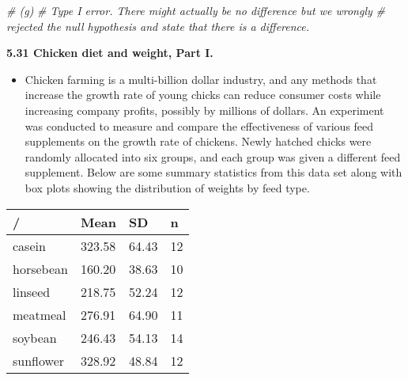 \documentclass[]{book}
\newenvironment{Shaded}{\begin{snugshade}}{\end{snugshade}}
\newcommand{\CommentTok}[1]{\textcolor[rgb]{0.56,0.35,0.01}{\textit{#1}}}
\providecommand{\tightlist}{%
  \setlength{\itemsep}{0pt}\setlength{\parskip}{0pt}}
\begin{document}
\begin{Shaded}
\begin{Highlighting}[]
\CommentTok{# (g)}
\CommentTok{# Type I error. There might actually be no difference but we wrongly }
\CommentTok{# rejected the null hypothesis and state that there is a difference.}
\end{Highlighting}
\end{Shaded}

\textbf{5.31 Chicken diet and weight, Part I.}

\begin{itemize}
\tightlist
\item
  Chicken farming is a multi-billion dollar industry, and any methods that increase the growth rate of young chicks can reduce consumer costs while increasing company profits, possibly by millions of dollars. An experiment was conducted to measure and compare the effectiveness of various feed supplements on the growth rate of chickens. Newly hatched chicks were randomly allocated into six groups, and each group was given a different feed supplement. Below are some summary statistics from this data set along with box plots showing the distribution of weights by feed type.
\end{itemize}

\begin{longtable}[]{@{}llll@{}}
\toprule
/ & Mean & SD & n\tabularnewline
\midrule
\endhead
casein & 323.58 & 64.43 & 12\tabularnewline
horsebean & 160.20 & 38.63 & 10\tabularnewline
linseed & 218.75 & 52.24 & 12\tabularnewline
meatmeal & 276.91 & 64.90 & 11\tabularnewline
soybean & 246.43 & 54.13 & 14\tabularnewline
sunflower & 328.92 & 48.84 & 12\tabularnewline
\bottomrule
\end{longtable}
\end{document}
